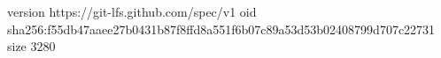 version https://git-lfs.github.com/spec/v1
oid sha256:f55db47aaee27b0431b87f8ffd8a551f6b07c89a53d53b02408799d707c22731
size 3280
